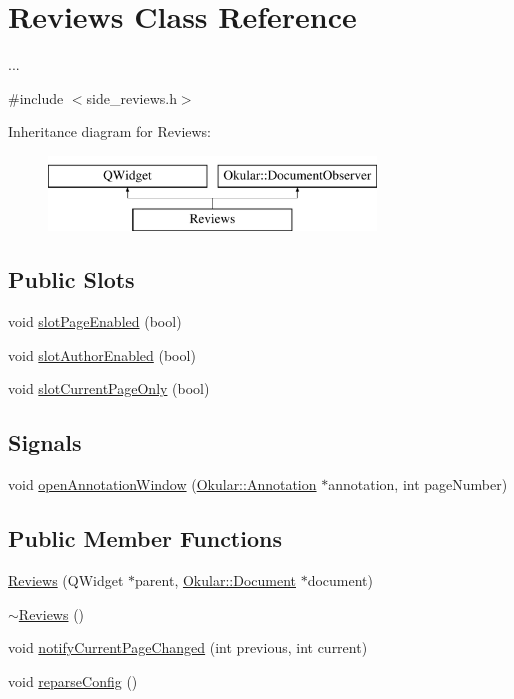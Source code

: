 \hypertarget{classReviews}{\section{Reviews Class Reference}
\label{classReviews}
}


...  




{\ttfamily \#include $<$side\+\_\+reviews.\+h$>$}

Inheritance diagram for Reviews\+:\begin{figure}[H]
\begin{center}
\leavevmode
\includegraphics[height=2.000000cm]{classReviews}
\end{center}
\end{figure}
\subsection*{Public Slots}
\begin{DoxyCompactItemize}
\item 
void \hyperlink{classReviews_a884ff0b3c877df9ac8712fbb12508889}{slot\+Page\+Enabled} (bool)
\item 
void \hyperlink{classReviews_ab14f6fd357e839d3af49183c1e835ab7}{slot\+Author\+Enabled} (bool)
\item 
void \hyperlink{classReviews_a96f6cafbb26eba382c4e85ef5be47c5d}{slot\+Current\+Page\+Only} (bool)
\end{DoxyCompactItemize}
\subsection*{Signals}
\begin{DoxyCompactItemize}
\item 
void \hyperlink{classReviews_a32fa6fc417477ca12ab9debaf581ed0f}{open\+Annotation\+Window} (\hyperlink{classOkular_1_1Annotation}{Okular\+::\+Annotation} $\ast$annotation, int page\+Number)
\end{DoxyCompactItemize}
\subsection*{Public Member Functions}
\begin{DoxyCompactItemize}
\item 
\hyperlink{classReviews_a3e345dbb11ed1771395e86623837d24b}{Reviews} (Q\+Widget $\ast$parent, \hyperlink{classOkular_1_1Document}{Okular\+::\+Document} $\ast$document)
\item 
\hyperlink{classReviews_a0d9d5614a54836b869a025f230e2e147}{$\sim$\+Reviews} ()
\item 
void \hyperlink{classReviews_ad7224fb14a888d754f40df21bae79ea8}{notify\+Current\+Page\+Changed} (int previous, int current)
\item 
void \hyperlink{classReviews_ac203742c4e8722583fbfa2741c119e89}{reparse\+Config} ()
\end{DoxyCompactItemize}
